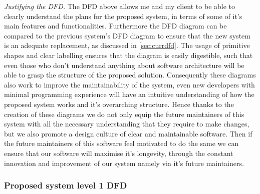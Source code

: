 \textit{Justifying the DFD.} The DFD above allows me and my 
client to be able to clearly understand the plans for the 
proposed system, in terms of some of it's main features and 
functionalities. Furthermore the DFD diagram can be compared to
the previous system's DFD diagram to ensure that the new 
system is an adequate replacement, as discussed in
\ref{sec:currdfd}. The usage of primitive shapes and clear 
labelling ensures that the diagram is easily digestible, such 
that even those who don't understand anything about software
architecture will be able to grasp the structure of the 
proposed solution. Consequently these diagrams also work to 
improve the maintainability of the system, even new developers
with minimal programming experience will have an intuitive 
understanding of how the proposed system works and it's
overarching structure. Hence thanks to the creation of these 
diagrams we do not only equip the future maintainers of this 
system with all the necessary understanding that they require
to make changes, but we also promote a design culture of clear
and maintainable software. Then if the future maintainers of this
software feel motivated to do the same we can ensure that our 
software will maximise it's longevity, through the constant 
innovation and improvement of our system namely via it's 
future maintainers.

\subsubsection{Proposed system level 1 DFD} 

